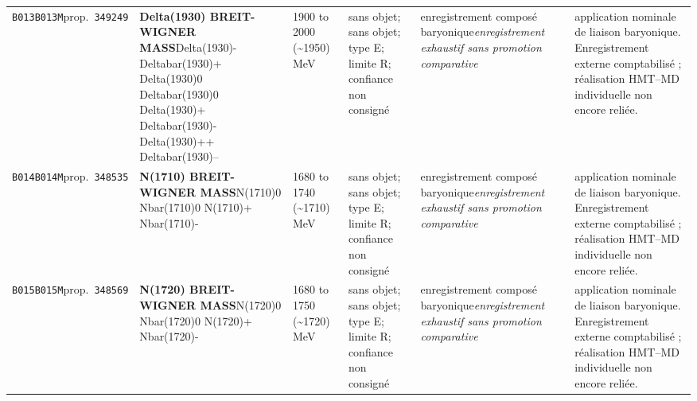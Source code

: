 \begin{landscape}
\begin{longtable}{L{1.85cm}L{4.45cm}L{2.35cm}L{4.05cm}L{3.35cm}L{7.15cm}}
\texttt{B013}\newline \texttt{B013M}\newline prop.\ \texttt{349249} & \textbf{Delta(1930) BREIT-WIGNER MASS}\newline Delta(1930)- \textbar{}\allowbreak{} Deltabar(1930)+ \textbar{}\allowbreak{} Delta(1930)0 \textbar{}\allowbreak{} Deltabar(1930)0 \textbar{}\allowbreak{} Delta(1930)+ \textbar{}\allowbreak{} Deltabar(1930)- \textbar{}\allowbreak{} Delta(1930)++ \textbar{}\allowbreak{} Deltabar(1930)-- & 1900 to 2000 (\textasciitilde{}1950)\,MeV & sans objet; sans objet; type E; limite R; confiance non consigné & enregistrement composé baryonique\newline \emph{enregistrement exhaustif sans promotion comparative} & application nominale de liaison baryonique. Enregistrement externe comptabilisé ; réalisation HMT--MD individuelle non encore reliée. \\
\texttt{B014}\newline \texttt{B014M}\newline prop.\ \texttt{348535} & \textbf{N(1710) BREIT-WIGNER MASS}\newline N(1710)0 \textbar{}\allowbreak{} Nbar(1710)0 \textbar{}\allowbreak{} N(1710)+ \textbar{}\allowbreak{} Nbar(1710)- & 1680 to 1740 (\textasciitilde{}1710)\,MeV & sans objet; sans objet; type E; limite R; confiance non consigné & enregistrement composé baryonique\newline \emph{enregistrement exhaustif sans promotion comparative} & application nominale de liaison baryonique. Enregistrement externe comptabilisé ; réalisation HMT--MD individuelle non encore reliée. \\
\texttt{B015}\newline \texttt{B015M}\newline prop.\ \texttt{348569} & \textbf{N(1720) BREIT-WIGNER MASS}\newline N(1720)0 \textbar{}\allowbreak{} Nbar(1720)0 \textbar{}\allowbreak{} N(1720)+ \textbar{}\allowbreak{} Nbar(1720)- & 1680 to 1750 (\textasciitilde{}1720)\,MeV & sans objet; sans objet; type E; limite R; confiance non consigné & enregistrement composé baryonique\newline \emph{enregistrement exhaustif sans promotion comparative} & application nominale de liaison baryonique. Enregistrement externe comptabilisé ; réalisation HMT--MD individuelle non encore reliée. \\

\end{longtable}
\end{landscape}
